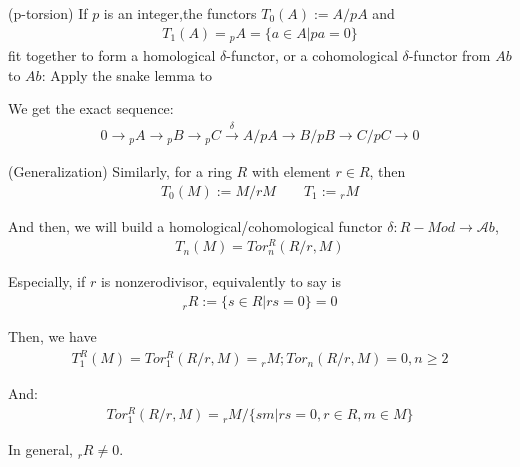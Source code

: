 \documentclass[Total.tex]{subfiles}
\begin{document}
			\begin{example}
				(p-torsion) If $p$ is an integer,the functors $T_0(A):=A/pA$ and
				\begin{gather*}
					T_1(A)={}_pA=\{a\in A|pa=0\}
				\end{gather*}
				fit together to form a homological $\delta$-functor, or a cohomological $\delta$-functor from $Ab$ to $Ab$: Apply the snake lemma to
				\begin{center}
				\end{center}
				We get the exact sequence:
				\begin{gather*}
					0\rightarrow{ }_p A\rightarrow { }_p B\rightarrow { }_p C\stackrel{\delta}{\rightarrow} A/pA\rightarrow B/pB\rightarrow C/pC\rightarrow 0
				\end{gather*}
			\end{example}
			\begin{example}
				(Generalization) Similarly, for a ring $R$ with element $r\in R$, then
				\begin{gather*}
					T_0(M):=M/rM\qquad T_1:={ }_r M
				\end{gather*}
				
				And then, we will build a homological/cohomological functor $\delta:R-Mod\rightarrow {\mathcal Ab}$,
				\begin{gather*}
					T_n(M)=Tor_n^R(R/r,M)
				\end{gather*}
				
				Especially, if $r$ is nonzerodivisor, equivalently to say is 
				\begin{gather*}
					{ }_r R:=\{s\in R|rs=0\}=0
				\end{gather*}
				
				Then, we have
				\begin{gather*}
					T_1^R(M)=Tor_1^R(R/r,M)={ }_r M;Tor_n(R/r,M)=0,n\geq 2
				\end{gather*}
				
				And:
				\begin{gather*}
					Tor_1^R(R/r,M)={ }_r M/\{sm|rs=0,r\in R,m\in M\}
				\end{gather*}
				
				In general, ${ }_r R\not=0$.
			\end{example}
			
\end{document}
